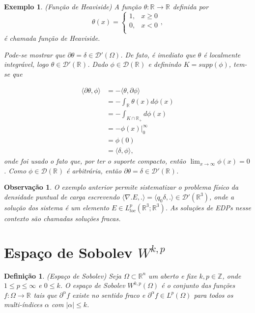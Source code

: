 \documentclass[12pt]{book}
\newtheorem{definicao}[teorema]{Definição}
\newtheorem{exemplo}[teorema]{Exemplo}
\newtheorem{observacao}[teorema]{Observação}
\newcommand{\distribuicoes}{\distribuicoesgeral{\Omega}}
\newcommand{\distribuicoesgeral}[1]{\mathcal{D'}(#1)}
\newcommand{\espacoLp}[1]{L^{p}(#1)}
\newcommand{\espacoLpcomp}[1]{L^{p}_{loc}(#1)}
\newcommand{\funcaocond}[5]{
	#1 = 
	\left\{
	\begin{array}{cc}
		#2, & #3\\
		#4, & #5\\
	\end{array}
	\right.
}
\newcommand{\funcoestestegeral}[1]{\mathcal{D}(#1)}
\newcommand{\inteiros}{\mathbb{Z}}
\newcommand{\produtointerno}[2]{\langle #1, #2 \rangle}
\newcommand{\real}[1]{\mathbb{R}^{#1}}
\newcommand{\reta}{\real{}}
\begin{document}
	\begin{exemplo}
		(Função de Heaviside) A função $\theta:\reta \to \reta$ definida por
		$$
		\funcaocond{\theta(x)}{1}{x\geq0}{0}{x<0},
		$$
		é chamada  função de Heaviside.
		
		Pode-se mostrar que $\partial\theta = \delta \in \distribuicoes$. De fato, é imediato que $\theta$ é localmente integrável, logo $\theta \in \distribuicoesgeral{\reta}$. Dado $\phi \in \funcoestestegeral{\reta}$ e definindo $K=supp(\phi)$, tem-se que 
		
		$$
		\begin{aligned}
		\produtointerno{\partial\theta}{\phi} 
		&= -\produtointerno{\theta}{\partial\phi} 
		\\
		&=-\int_{\reta}\theta(x)d\phi(x)
		\\
		&= -\int_{K\cap\reta_{+}}  d\phi(x) 
		\\
		&= -\phi(x)\Big|^{\infty}_{0} 
		\\
		&= \phi(0) 
		\\
		&= \produtointerno{\delta}{\phi},
		\end{aligned}
		$$
		onde foi usado o fato que, por ter o suporte compacto, então $\lim_{x\to \infty}\phi(x)=0$.
		Como $\phi \in \funcoestestegeral{\reta}$ é arbitrária, então $\partial \theta = \delta \in \distribuicoesgeral{\reta}$.
	\end{exemplo}
	
	\begin{observacao}
		O exemplo anterior permite sistematizar o problema físico da densidade puntual de carga escrevendo $\produtointerno{\nabla.E}{.} = \produtointerno{q_{0}\delta}{.} \in \distribuicoesgeral{\real{3}}$, onde a solução dos sistema é um elemento $E\in \espacoLpcomp{\real{3};\real{3}}$. As soluções de EDPs nesse contexto são chamadas soluções fracas.
	\end{observacao}

	\section{Espaço de Sobolev $W^{k,p}$}\label{secao_espaco_sobolev}
	
	\begin{definicao}\label{definicao_espaco_sobolev}
		(Espaço de Sobolev) Seja $\Omega \subset \real{n}$ um aberto e fixe $k, p\in \inteiros$, onde $1\leq p \leq \infty$ e $0\leq k$. O espaço de Sobolev $W^{k,p} (\Omega)$ é o conjunto das funções $f:\Omega\to \reta$ tais que $\partial^{\alpha}f$ existe no sentido fraco e $\partial^{\alpha}f \in \espacoLp{\Omega}$ para todos os multi-índices $\alpha$ com $|\alpha|\leq k$.
	\end{definicao}
	
\end{document}

